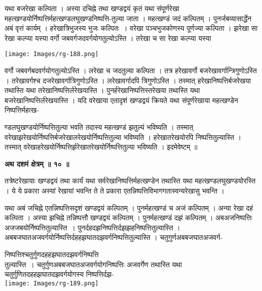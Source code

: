 \documentclass[11pt, openany]{book}
\begin{document}
यथा बजरेखा कल्पिता । अस्या दचिह्ने तथा खण्डद्वयं कृतं यथा
संपूर्णरेखा  महत्खण्डयोर्निष्पत्तिर्महत्खण्डलघुखण्डनिष्पत्ति-तुल्या जाता । महत्खण्डं जदं
कल्पितम् । पुनर्जबव्यासार्द्धेन अबं वृत्तं कार्यम् । हरेखात्रिभुजस्य भुजः कल्पितः~। वरेखा पञ्चभुजकोणस्य पूर्णज्या कल्पिता । झरेखा सा रेखा कल्प्या यस्या वर्गो जबवर्गजदवर्गयोगतुल्योऽस्ति । तरेखा च सा रेखा कल्प्या यस्या \\
\begin{center}
\noindent \texttt{[image: Images/rg-188.png]}  
\end{center}
वर्गो जबवर्गबदवर्गयोगतुल्योऽस्ति । लरेखा च जदतुल्या कल्पिता । तत्र हरेखावर्गो बजरेखावर्गान्त्रिगुणोऽस्ति । तरेखावर्गश्च दजरेखावर्गात्रिगुणोऽस्ति । लरेखावर्गादपि त्रिगुणोऽस्ति । तस्मात् हरेखानिष्पत्तिर्बजरेखया तथास्ति यथा तरेखानिष्पत्तिर्लरेखयास्ति । पुनर्हरेखानिष्पत्तिस्तरेखया तथास्ति यथा बजरेखानिष्पत्तिर्लरेखयास्ति । यदि वरेखाया एतादृशं खण्डद्वयं क्रियते यथा संपूर्णरेखाया महत्खण्डेन निष्पत्तिर्महत्ख-

\newpage
\noindent ण्डलघुखण्डयोर्निष्पत्तितुल्या भवति तदास्य महत्खण्डं झतुल्यं भविष्यति । तस्मात्
वरेखाझरेखयोर्निष्पत्तिर्बजरेखालरेखयोर्निष्पत्तितुल्या भविष्यति । हरेखातरेखयोरपि निष्पत्तितुल्यास्ति । तस्मात् वरेखाहरेखयोर्निष्पत्तिर्झरेखातरेखयोर्निष्पत्तितुल्या भविष्यति । इदमेवेष्टम् ॥\\
\begin{center}
\textbf{\large अथ दशमं क्षेत्रम् ॥ १० ॥ }
\end{center}
\vspace{5mm}

{\ab तत्रेष्टरेखायाः खण्डद्वयं तथा कार्यं यथा सर्वरेखानिष्पत्तिर्महत्खण्डेन तथास्ति यथा महत्खण्डलघुखण्डयोरस्ति । ये ये प्रकारा अस्यां रेखायां भवन्ति ते ते प्रकारा एतन्निष्पत्तिविभागगतास्वन्यरेखासु भवन्ति ।}\\
\vspace{3mm}

यथा अबं जचिह्ने एतन्निष्पत्तिसदृशं खण्डद्वयं कल्पितम् । पुनर्महत्खण्डं च अजं कल्पितम् । अन्या रेखा दहं कल्पिता । अस्या झचिह्ने तन्निष्पत्तौ खण्डद्वयं कल्पितम् । पुनर्महत्खण्डं दझं कल्पितम् । अबअजनिष्पत्तिः अजजबयोर्निष्पत्तितुल्यास्ति~। पुनर्दहदझनिष्पत्तिर्दझझहनिष्पत्तितुल्यास्ति । अबबजघातअजवर्गयोर्निष्पत्तिर्दहहझघातदझवर्गनिष्पत्तितुल्यास्ति । चतुगुर्णअबबजघातअजवर्ग-
\begin{vwcol}[widths={0.6,0.4}, sep=.8cm, rule=0pt]
निष्पत्तिश्चतुर्गुणदहहझघातदझवर्गनिष्पत्ति\\
\noindent तुल्यास्ति~। चतुर्गुणअबबजघातअजवर्गयोगनिष्पत्तिः अजवर्गेण तथास्ति यथा चतुर्गुणितदहहझघातदझवर्गयोगस्य निष्पत्तिर्दझ-\\ 
\noindent \texttt{[image: Images/rg-189.png]}  
\end{vwcol}
\vspace{-2mm}
\end{document}
